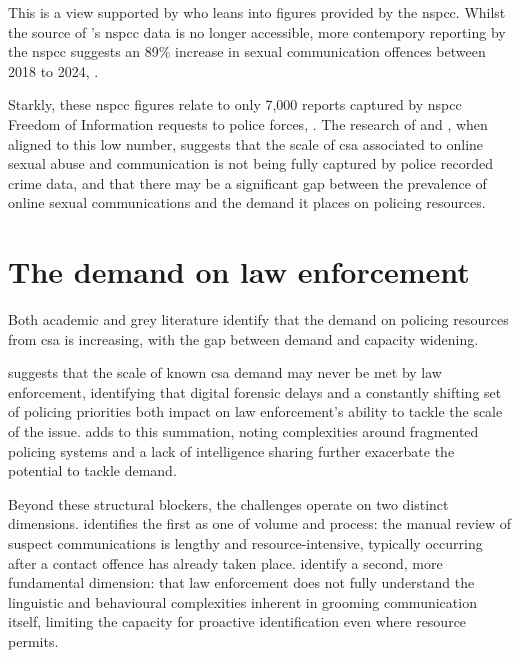 \documentclass[12pt,a4paper,oneside]{report}
\begin{document}
This is a view supported by \citet{wefers2024understanding} who leans into figures provided by the \gls{nspcc}.  Whilst the source of \citet{wefers2024understanding}'s \gls{nspcc} data is no longer accessible, more contempory reporting by the \gls{nspcc} suggests an 89\% increase in sexual communication offences between 2018 to 2024, \citep{nspcc2024online}.

Starkly, these \gls{nspcc} figures relate to only 7,000 reports captured by \gls{nspcc} Freedom of Information requests to police forces, \citep{nspcc2024online}.  The research of \citet{finkelhor2024prevalence} and \citet{wefers2024understanding}, when aligned to this low number, suggests that the scale of \gls{csa} associated to online sexual abuse and communication is not being fully captured by police recorded crime data, and that there may be a significant gap between the prevalence of online sexual communications and the demand it places on policing resources.  

\section{The demand on law enforcement}
\label{sec:the-demand-on-law-enforcement}
Both academic and grey literature identify that the demand on policing resources from \gls{csa} is increasing, with the gap between demand and capacity widening.  

\citet{jay2022report} suggests that the scale of known \gls{csa} demand may never be met by law enforcement, identifying that digital forensic delays and a constantly shifting set of policing priorities both impact on law enforcement's ability to tackle the scale of the issue. \citet{casey2025gbcse} adds to this summation, noting complexities around fragmented policing systems and a lack of intelligence sharing further exacerbate the potential to tackle demand.  

Beyond these structural blockers, the challenges operate on two distinct dimensions. \citet{li2020identifying} identifies the first as one of volume and process: the manual review of suspect communications is lengthy and resource-intensive, typically occurring after a contact offence has already taken place. \citet{winters2022universal} identify a second, more fundamental dimension: that law enforcement does not fully understand the linguistic and behavioural complexities inherent in grooming communication itself, limiting the capacity for proactive identification even 
where resource permits.
\end{document}
